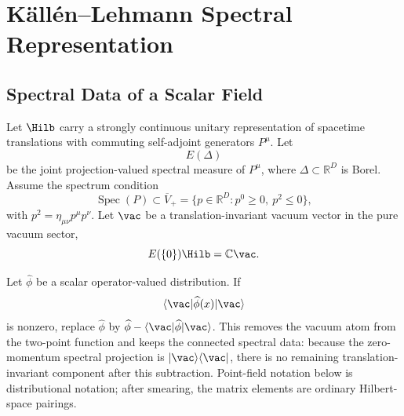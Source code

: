 \chapter{K\"all\'en--Lehmann Spectral Representation}
\label{ch:kallen-lehmann}
\ConventionsLorentzian


\section{Spectral Data of a Scalar Field}

\begin{definition}
\label{def:kallen-lehmann-centered-scalar-spectral-datum}
Let \(\Hilb\) carry a strongly continuous unitary representation of spacetime
translations with commuting self-adjoint generators \(P^\mu\). Let
\[
  E(\Delta)
\]
be the joint projection-valued spectral measure of \(P^\mu\), where
\(\Delta\subset\mathbb R^D\) is Borel. Assume the spectrum condition
\[
  \operatorname{Spec}(P)\subset\overline V_+
  =
  \{p\in\mathbb R^D:p^0\ge0,\ p^2\le0\},
\]
with \(p^2=\eta_{\mu\nu}p^\mu p^\nu\). Let \(\vac\) be a translation-invariant
vacuum vector in the pure vacuum sector,
\[
  E(\{0\})\Hilb=\mathbb C\vac .
\]

Let \(\widehat\phi\) be a scalar operator-valued distribution. If
\[
  \langle\vac|\widehat\phi(x)|\vac\rangle
\]
is nonzero, replace \(\widehat\phi\) by
\(\widehat\phi-\langle\vac|\widehat\phi|\vac\rangle\). This removes the
vacuum atom from the two-point function and keeps the connected spectral data:
because the zero-momentum spectral projection is \(|\vac\rangle\langle\vac|\),
there is no remaining translation-invariant component after this subtraction.
Point-field notation below is distributional notation; after smearing, the
matrix elements are ordinary Hilbert-space pairings.
\end{definition}

